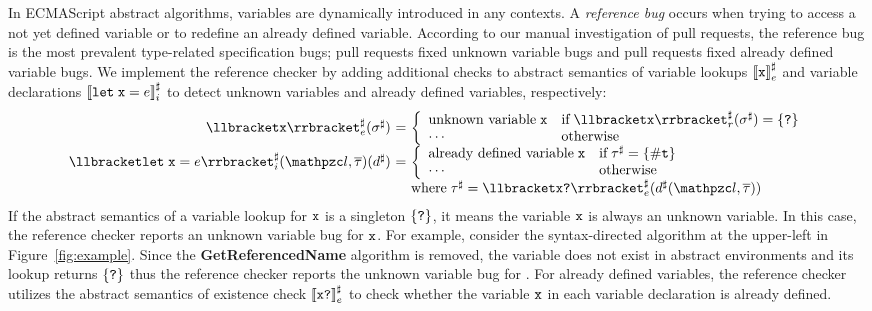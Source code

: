 In ECMAScript abstract algorithms, variables are dynamically introduced in any
contexts.  A \textit{reference bug} occurs when trying to access a not yet
defined variable or to redefine an already defined variable.  According to our
manual investigation of pull requests, the reference bug is the most prevalent
type-related specification bugs;  pull requests fixed 
unknown variable bugs and  pull requests fixed  already
defined variable bugs.  We implement the reference checker by adding additional
checks to abstract semantics of variable lookups ${\llbracket{\texttt{x}}\rrbracket}^\sharp_e$ and variable
declarations ${\llbracket{\texttt{let}\; \texttt{x}= e}\rrbracket}^\sharp_i$ to detect unknown variables and
already defined variables, respectively:
\[
  \begin{array}{r@{~}c@{~}l}
    \aseme{\x}(\aenv) &=& \left\{
      \begin{array}{ll}
        \text{unknown variable} \; $\x$
        & \text{if} \; \asemr{\x}(\aenv) = \{ \tabsent \}\\
        \cdots
        & \text{otherwise}\\
      \end{array}
    \right.\\

    \asemi{\kwlet \; \x = \expr}(\lab, \tys)(\aelem) &=& \left\{
      \begin{array}{ll}
        \text{already defined variable} \; $\x$
        & \text{if} \; \aty = \{ \true \}\\
        \cdots
        & \text{otherwise}\\
      \end{array}
    \right.\\ &&
    \text{where} \; \aty = \aseme{\x \kwexists}(\aelem(\lab, \tys))\\
  \end{array}
\]
If the abstract semantics of a variable lookup for $\texttt{x}$ is a singleton $\{
\texttt{?} \}$, it means the variable $\texttt{x}$ is always an unknown variable.  In this
case, the reference checker reports an unknown variable bug for $\texttt{x}$.  For
example, consider the syntax-directed algorithm at the upper-left in
Figure~\ref{fig:example}.  Since the \textbf{GetReferencedName} algorithm is
removed, the variable  does not exist in abstract
environments and its lookup returns $\{ \texttt{?} \}$ thus the reference checker
reports the unknown variable bug for .  For already
defined variables, the reference checker utilizes the abstract semantics of
existence check ${\llbracket{\texttt{x}\texttt{?}}\rrbracket}^\sharp_e$ to check whether the variable $\texttt{x}$ in
each variable declaration is already defined.


